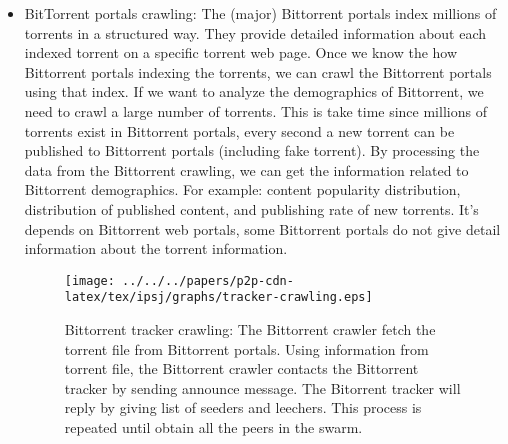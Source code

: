 \begin{itemize}
\item BitTorrent portals crawling: 
The (major) Bittorrent portals index millions of torrents in a structured way. 
They provide detailed information about each indexed torrent on a specific torrent web page. 
Once we know the how Bittorrent portals indexing the torrents, we can crawl the Bittorrent portals using that index.
If we want to analyze the demographics of Bittorrent, we need to crawl a large number of torrents.
This is take time since millions of torrents exist in Bittorrent portals, every second a new torrent can be published to Bittorrent portals (including fake torrent).
By processing the data from the Bittorrent crawling, we can get the information related to Bittorrent demographics.
For example: content popularity distribution, distribution of published content, and publishing rate of new torrents.
It's depends on Bittorrent web portals, some Bittorrent portals do not give detail information about the torrent information. 

\begin{figure}[tb]
\begin{center}
\texttt{[image: ../../../papers/p2p-cdn-latex/tex/ipsj/graphs/tracker-crawling.eps]}
\end{center}
\caption{Bittorrent tracker crawling: The Bittorrent crawler fetch the torrent file from Bittorrent portals. Using information from torrent file, the Bittorrent crawler contacts the Bittorrent tracker by sending announce message. The Bitorrent tracker will reply by giving list of seeders and leechers. This process is repeated until obtain all the peers in the swarm.} 
\label{fig:trackercrawling}
\end{figure}



\end{itemize}
